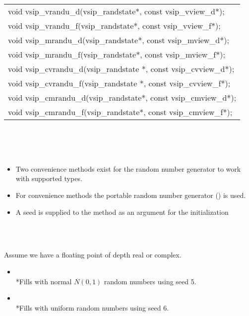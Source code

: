 \begin{table}[h]
\begin{tabular}[H]{|l|}
\hline
void vsip\_vrandu\_d(vsip\_randstate*, const vsip\_vview\_d*);\\
void vsip\_vrandu\_f(vsip\_randstate*, const vsip\_vview\_f*);\\
void vsip\_mrandu\_d(vsip\_randstate*, const vsip\_mview\_d*);\\
void vsip\_mrandu\_f(vsip\_randstate*, const vsip\_mview\_f*);\\
void vsip\_cvrandu\_d(vsip\_randstate *, const vsip\_cvview\_d*);\\
void vsip\_cvrandu\_f(vsip\_randstate *, const vsip\_cvview\_f*);\\
void vsip\_cmrandu\_d(vsip\_randstate*, const vsip\_cmview\_d*);\\
void vsip\_cmrandu\_f(vsip\_randstate*, const vsip\_cmview\_f*);\\
\hline
\end{tabular}
\end{table}
\\\pyjvsiph
\\\\
\hspace*{.07\textwidth}\parbox{.92\textwidth}{
\begin{itemize}
\item{Two convenience methods exist for the random number generator to work with supported  types.\vspace*{1mm}}
\item{For convenience methods the portable random number generator () is used.\vspace*{1mm}}
\item{A seed is supplied to the method as an argument for  the initialization\vspace*{1mm}}
\end{itemize}\vspace*{1mm}}\\
\\
\hspace*{.09\textwidth}\parbox{.9\textwidth}{Assume we have a floating point  of depth real or complex.\\
\begin{itemize}
\item{\vspace*{1mm}\\*Fills  with normal $N(0,1)$ random numbers using seed 5.}
\item{\vspace*{1mm}\\*Fills  with uniform random numbers using seed 6.}
\end{itemize}}\\
